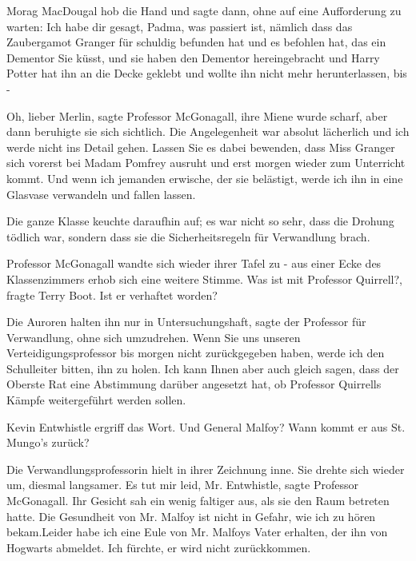 Morag MacDougal hob die Hand und sagte dann, ohne auf eine Aufforderung zu
warten: \glqq{}Ich habe dir gesagt, Padma, was passiert ist, nämlich dass das
Zaubergamot Granger für schuldig befunden hat und es befohlen hat, das ein
Dementor Sie küsst, und sie haben den Dementor hereingebracht und Harry Potter
hat ihn an die Decke geklebt und wollte ihn nicht mehr herunterlassen, bis
-\grqq{}

\glqq{}Oh, lieber Merlin\grqq{}, sagte Professor McGonagall, ihre Miene wurde
scharf, aber dann beruhigte sie sich sichtlich. \glqq{}Die Angelegenheit war
absolut lächerlich und ich werde nicht ins Detail gehen. Lassen Sie es dabei
bewenden, dass Miss Granger sich vorerst bei Madam Pomfrey ausruht und erst
morgen wieder zum Unterricht kommt. Und wenn ich jemanden erwische, der sie
belästigt, werde ich ihn in eine Glasvase verwandeln und fallen lassen.\grqq{}

Die ganze Klasse keuchte daraufhin auf; es war nicht so sehr, dass die Drohung
tödlich war, sondern dass sie die Sicherheitsregeln für Verwandlung brach.

Professor McGonagall wandte sich wieder ihrer Tafel zu - aus einer Ecke des
Klassenzimmers erhob sich eine weitere Stimme. \glqq{}Was ist mit Professor
Quirrell?\grqq{}, fragte Terry Boot. \glqq{}Ist er verhaftet worden?\grqq{}

\glqq{}Die Auroren halten ihn nur in Untersuchungshaft\grqq{}, sagte der
Professor für Verwandlung, ohne sich umzudrehen. \glqq{}Wenn Sie uns unseren
Verteidigungsprofessor bis morgen nicht zurückgegeben haben, werde ich den
Schulleiter bitten, ihn zu holen. Ich kann Ihnen aber auch gleich sagen, dass
der Oberste Rat eine Abstimmung darüber angesetzt hat, ob Professor Quirrells
Kämpfe weitergeführt werden sollen.\grqq{}

Kevin Entwhistle ergriff das Wort. \glqq{}Und General Malfoy? Wann kommt er aus
St. Mungo's zurück?\grqq{}

Die Verwandlungsprofessorin hielt in ihrer Zeichnung inne. Sie drehte sich
wieder um, diesmal langsamer. \glqq{}Es tut mir leid, Mr. Entwhistle\grqq{},
sagte Professor McGonagall. Ihr Gesicht sah ein wenig faltiger aus, als sie den
Raum betreten hatte. \glqq{}Die Gesundheit von Mr. Malfoy ist nicht in Gefahr,
wie ich zu hören bekam.Leider habe ich eine Eule von Mr. Malfoys Vater erhalten,
der ihn von Hogwarts abmeldet. Ich fürchte, er wird nicht zurückkommen.\grqq{}

